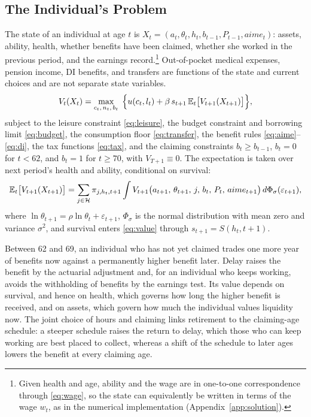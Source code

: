 \subsection{The Individual's Problem}\label{sec:model_recursive}

The state of an individual at age $t$ is $X_t=(a_t,\theta_t,h_t,b_{t-1},P_{t-1},aime_t)$: assets, ability, health, whether benefits have been claimed, whether she worked in the previous period, and the earnings record.\footnote{Given health and age, ability and the wage are in one-to-one correspondence through \eqref{eq:wage}, so the state can equivalently be written in terms of the wage $w_t$, as in the numerical implementation (Appendix~\ref{app:solution}).} Out-of-pocket medical expenses, pension income, DI benefits, and transfers are functions of the state and current choices and are not separate state variables. %
\begin{equation}\label{eq:value}
V_t(X_t)=\max_{c_t,\,n_t,\,b_t}\;\Big\{u(c_t,l_t)+\beta\,s_{t+1}\,\mathbb{E}_t\big[V_{t+1}(X_{t+1})\big]\Big\},
\end{equation}
subject to the leisure constraint \eqref{eq:leisure}, the budget constraint and borrowing limit \eqref{eq:budget}, the consumption floor \eqref{eq:transfer}, the benefit rules \eqref{eq:aime}--\eqref{eq:di}, the tax functions \eqref{eq:tax}, and the claiming constraints $b_t\geq b_{t-1}$, $b_t=0$ for $t<62$, and $b_t=1$ for $t\geq 70$, with $V_{T+1}\equiv 0$. The expectation is taken over next period's health and ability, conditional on survival:
\begin{equation*}
\mathbb{E}_t\big[V_{t+1}(X_{t+1})\big]=\sum_{j\in\mathcal{H}}\pi_{j,h_t,t+1}\int V_{t+1}\big(a_{t+1},\,\theta_{t+1},\,j,\,b_t,\,P_t,\,aime_{t+1}\big)\,d\Phi_{\sigma}(\varepsilon_{t+1}),
\end{equation*}
where $\ln\theta_{t+1}=\rho\ln\theta_t+\varepsilon_{t+1}$, $\Phi_\sigma$ is the normal distribution with mean zero and variance $\sigma^2$, and survival enters \eqref{eq:value} through $s_{t+1}=S(h_t,t+1)$.

Between 62 and 69, an individual who has not yet claimed trades one more year of benefits now against a permanently higher benefit later. Delay raises the benefit by the actuarial adjustment and, for an individual who keeps working, avoids the withholding of benefits by the earnings test. Its value depends on survival, and hence on health, which governs how long the higher benefit is received, and on assets, which govern how much the individual values liquidity now. The joint choice of hours and claiming links retirement to the claiming-age schedule: a steeper schedule raises the return to delay, which those who can keep working are best placed to collect, whereas a shift of the schedule to later ages lowers the benefit at every claiming age.

